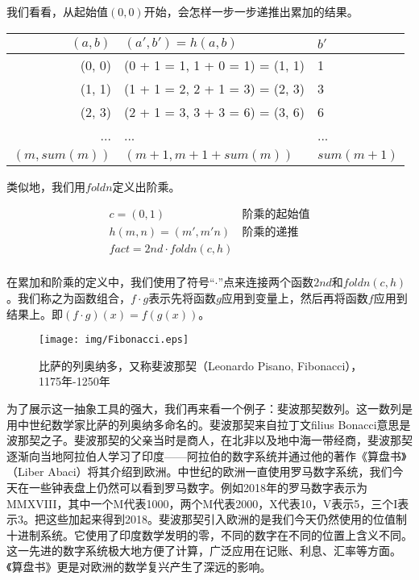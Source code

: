 \documentclass[UTF8]{article}
\begin{document}
我们看看，从起始值$(0, 0)$开始，会怎样一步一步递推出累加的结果。

\begin{tabular}{r|l|l}
$(a, b)$ & $(a', b') = h (a, b)$ & $b'$\\
\hline
(0, 0) & (0 + 1 = 1, 1 + 0 = 1) = (1, 1) & 1 \\
(1, 1) & (1 + 1 = 2, 2 + 1 = 3) = (2, 3) & 3 \\
(2, 3) & (2 + 1 = 3, 3 + 3 = 6) = (3, 6) & 6 \\
... & ... & ... \\
$(m, sum(m))$ & $(m + 1, m + 1 + sum(m))$ & $sum(m + 1)$
\end{tabular}

类似地，我们用$foldn$定义出阶乘。

\[
\begin{array}{lr}
c = (0, 1) & \text{阶乘的起始值} \\
h (m, n) = (m', m'n) & \text{阶乘的递推} \\
fact = 2nd \cdot foldn(c, h) \\
\end{array}
\]

在累加和阶乘的定义中，我们使用了符号“$\cdot$”点来连接两个函数$2nd$和$foldn(c, h)$。我们称之为函数组合，$f\cdot g$表示先将函数$g$应用到变量上，然后再将函数$f$应用到结果上。即$(f\cdot g)(x) = f(g(x))$。

\begin{wrapfigure}{R}{0.4\textwidth}
 \centering
 \texttt{[image: img/Fibonacci.eps]}
 \caption{比萨的列奥纳多，又称斐波那契（Leonardo Pisano, Fibonacci），1175年-1250年}
 \label{fig:abstract-num}
\end{wrapfigure}

为了展示这一抽象工具的强大，我们再来看一个例子：斐波那契数列。这一数列是用中世纪数学家比萨的列奥纳多命名的。斐波那契来自拉丁文filius Bonacci意思是波那契之子。斐波那契的父亲当时是商人，在北非以及地中海一带经商，斐波那契逐渐向当地阿拉伯人学习了印度——阿拉伯的数字系统并通过他的著作《算盘书》（Liber Abaci）将其介绍到欧洲。中世纪的欧洲一直使用罗马数字系统，我们今天在一些钟表盘上仍然可以看到罗马数字。例如2018年的罗马数字表示为MMXVIII，其中一个M代表1000，两个M代表2000，X代表10，V表示5，三个I表示3。把这些加起来得到2018。斐波那契引入欧洲的是我们今天仍然使用的位值制十进制系统。它使用了印度数学发明的零，不同的数字在不同的位置上含义不同。这一先进的数字系统极大地方便了计算，广泛应用在记账、利息、汇率等方面。《算盘书》更是对欧洲的数学复兴产生了深远的影响。
\end{document}

